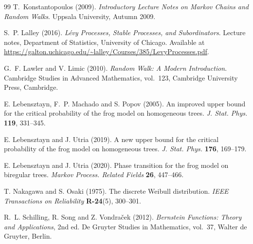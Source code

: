 \documentclass[preprint]{imsart}
\newcommand{\1}{\mathbf{1}}
\theoremstyle{plain}
\theoremstyle{definition}
\begin{document}
\begin{thebibliography}{99}
T.~Konstantopoulos (2009).
\emph{Introductory Lecture Notes on Markov Chains and Random Walks}.
Uppsala University, Autumn 2009.

S.~P. Lalley (2016).
\emph{Lévy Processes, Stable Processes, and Subordinators}.
Lecture notes, Department of Statistics, University of Chicago.
Available at \url{https://galton.uchicago.edu/~lalley/Courses/385/LevyProcesses.pdf}.

G.~F. Lawler and V. Limic (2010).
\emph{Random Walk: A Modern Introduction}.
Cambridge Studies in Advanced Mathematics, vol.~123,
Cambridge University Press, Cambridge.

E. Lebensztayn, F.~P. Machado and S. Popov (2005).
An improved upper bound for the critical probability of the frog model on homogeneous trees.
\textit{J. Stat. Phys.} \textbf{119}, 331--345.







E. Lebensztayn and J. Utria (2019).
A new upper bound for the critical probability of the frog model on homogeneous trees.
\textit{J. Stat. Phys.} \textbf{176}, 169--179.

E. Lebensztayn and J. Utria (2020).
Phase transition for the frog model on biregular trees.
\textit{Markov Process. Related Fields} \textbf{26}, 447--466.


T. Nakagawa and S. Osaki (1975).
The discrete Weibull distribution.
\emph{IEEE Transactions on Reliability} \textbf{R-24}(5), 300--301.

R.~L. Schilling, R. Song and Z. Vondra\v{c}ek (2012).
\emph{Bernstein Functions: Theory and Applications}, 2nd ed.
De Gruyter Studies in Mathematics, vol.~37, Walter de Gruyter, Berlin.
\end{thebibliography}
\end{document}
